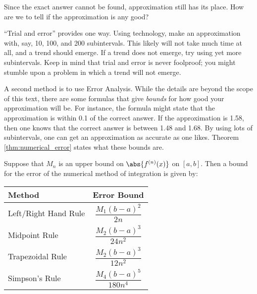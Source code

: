 Since the exact answer cannot be found, approximation still has its place. How are we to tell if the approximation is any good?

``Trial and error'' provides one way. %
Using technology, make an approximation with, say, 10, 100, and 200 subintervals. This likely will not take much time at all, and a trend should emerge. If a trend does not emerge, try using yet more subintervals. Keep in mind that trial and error is never foolproof; you might stumble upon a problem in which a trend will not emerge.

A second method is to use Error Analysis. While the details are beyond the scope of this text, there are some formulas that give \textit{bounds} for how good your approximation will be. For instance, the formula might state that the approximation is within 0.1 of the correct answer. If the approximation is 1.58, then one knows that the correct answer is between 1.48 and 1.68. By using lots of subintervals, one can get an approximation as accurate as one likes. Theorem \ref{thm:numerical_error} states what these bounds are.

%
{Suppose that $M_n$ is an upper bound on $\abs{f^{(n)}(x)}$ on $[a,b]$.  Then a bound for the error of the numerical method of integration is given by:
\begin{center}
\begin{tabular}{lc}
Method & Error Bound \\\hline
Left/Right Hand Rule & $\dfrac{M_1(b-a)^2}{2n}$ \\
Midpoint Rule & $\dfrac{M_2(b-a)^3}{24n^2}$ \\
Trapezoidal Rule & $\dfrac{M_2(b-a)^3}{12n^2}$ \\
Simpson's Rule & $\dfrac{M_4(b-a)^5}{180n^4}$
\end{tabular}
\end{center}}

